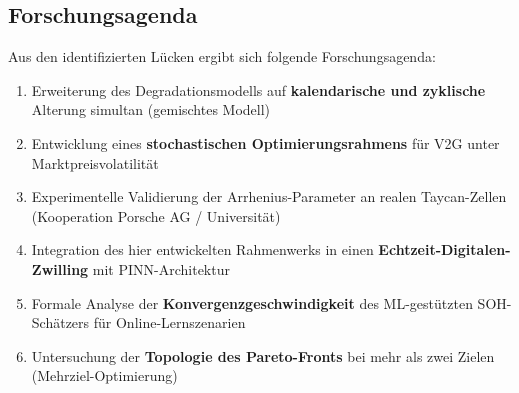 ﻿\documentclass[a4paper,12pt]{article}
\theoremstyle{definition}
\begin{document}
\subsection{Forschungsagenda}

Aus den identifizierten L\"ucken ergibt sich folgende Forschungsagenda:
\begin{enumerate}
  \item Erweiterung des Degradationsmodells auf \textbf{kalendarische
    und zyklische} Alterung simultan (gemischtes Modell)
  \item Entwicklung eines \textbf{stochastischen Optimierungsrahmens}
    f\"ur V2G unter Marktpreisvolatilität
  \item Experimentelle Validierung der Arrhenius-Parameter an
    realen Taycan-Zellen (Kooperation Porsche AG / Universit\"at)
  \item Integration des hier entwickelten Rahmenwerks in einen
    \textbf{Echtzeit-Digitalen-Zwilling} mit PINN-Architektur
  \item Formale Analyse der \textbf{Konvergenzgeschwindigkeit} des
    ML-gest\"utzten SOH-Sch\"atzers f\"ur Online-Lernszenarien
  \item Untersuchung der \textbf{Topologie des Pareto-Fronts}
    bei mehr als zwei Zielen (Mehrziel-Optimierung)
\end{enumerate}
\end{document}
